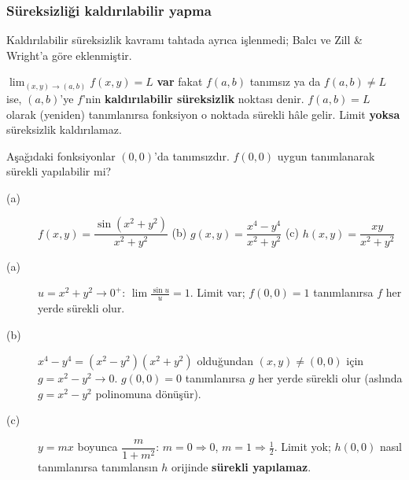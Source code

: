 \subsubsection{Süreksizliği kaldırılabilir yapma}

\begin{bilgi}
Kaldırılabilir süreksizlik kavramı tahtada ayrıca işlenmedi; Balcı ve Zill \& Wright'a göre eklenmiştir.
\end{bilgi}

\begin{tanim}
$\displaystyle\lim_{(x,y)\to(a,b)}f(x,y)=L$ \textbf{var} fakat $f(a,b)$ tanımsız ya da $f(a,b)\neq L$ ise, $(a,b)$'ye
$f$'nin \textbf{kaldırılabilir süreksizlik} noktası denir. $f(a,b)=L$ olarak (yeniden) tanımlanırsa fonksiyon o noktada
sürekli hâle gelir. Limit \textbf{yoksa} süreksizlik kaldırılamaz.
\end{tanim}

\begin{soru}
Aşağıdaki fonksiyonlar $(0,0)$'da tanımsızdır. $f(0,0)$ uygun tanımlanarak sürekli yapılabilir mi?
\begin{description}
  \item[(a)] $f(x,y)=\dfrac{\sin(x^2+y^2)}{x^2+y^2}$ \qquad
  (b) $g(x,y)=\dfrac{x^4-y^4}{x^2+y^2}$ \qquad
  (c) $h(x,y)=\dfrac{xy}{x^2+y^2}$
\end{description}
\end{soru}
\begin{cevap}
\begin{description}
  \item[(a)] $u=x^2+y^2\to0^+$: $\lim\frac{\sin u}{u}=1$. Limit var; $f(0,0)=1$ tanımlanırsa $f$ her yerde sürekli olur.
  \item[(b)] $x^4-y^4=(x^2-y^2)(x^2+y^2)$ olduğundan $(x,y)\neq(0,0)$ için $g=x^2-y^2\to0$. $g(0,0)=0$ tanımlanırsa
  $g$ her yerde sürekli olur (aslında $g=x^2-y^2$ polinomuna dönüşür).
  \item[(c)] $y=mx$ boyunca $\dfrac{m}{1+m^2}$: $m=0\Rightarrow0$, $m=1\Rightarrow\frac12$. Limit yok; $h(0,0)$ nasıl
  tanımlanırsa tanımlansın $h$ orijinde \textbf{sürekli yapılamaz}.
\end{description}
\end{cevap}

